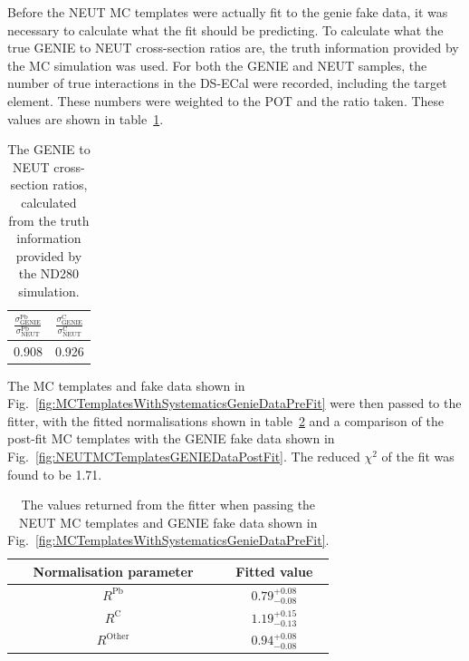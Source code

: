 \newline
\newline
Before the NEUT MC templates were actually fit to the genie fake data, it was necessary to calculate what the fit should be predicting.  To calculate what the true GENIE to NEUT cross-section ratios are, the truth information provided by the MC simulation was used.  For both the GENIE and NEUT samples, the number of true interactions in the DS-ECal were recorded, including the target element.  These numbers were weighted to the POT and the ratio taken.  These values are shown in table~\ref{table:GENIEToNEUTTrueCrossSectioRatio}.  
\begin{table}
  \begin{tabular}{c c }
    $\frac{\sigma^{\textrm{Pb}}_{\textrm{GENIE}}}{\sigma^{\textrm{Pb}}_{\textrm{NEUT}}}$ &$\frac{\sigma^{\textrm{C}}_{\textrm{GENIE}}}{\sigma^{\textrm{C}}_{\textrm{NEUT}}}$\\ \hline \hline
    0.908 & 0.926  \\
  \end{tabular}
  \caption{The GENIE to NEUT cross-section ratios, calculated from the truth information provided by the ND280 simulation.}
  \label{table:GENIEToNEUTTrueCrossSectioRatio}
\end{table}
\newline
\newline
The MC templates and fake data shown in Fig.~\ref{fig:MCTemplatesWithSystematicsGenieDataPreFit} were then passed to the fitter, with the fitted normalisations shown in table~\ref{table:NEUTMCTemplatesGENIEDataPostFit} and a comparison of the post-fit MC templates with the GENIE fake data shown in Fig.~\ref{fig:NEUTMCTemplatesGENIEDataPostFit}.  The reduced $\chi^2$ of the fit was found to be 1.71.  
\begin{table}
  \begin{tabular}{c c }
    Normalisation parameter & Fitted value \\ \hline \hline
    $R^{\textrm{Pb}}$ & $0.79^{+0.08}_{-0.08}$  \\
    $R^{\textrm{C}}$ & $1.19^{+0.15}_{-0.13}$  \\
    $R^{\textrm{Other}}$ & $0.94^{+0.08}_{-0.08}$  \\
  \end{tabular}
  \caption{The values returned from the fitter when passing the NEUT MC templates and GENIE fake data shown in Fig.~\ref{fig:MCTemplatesWithSystematicsGenieDataPreFit}.}
  \label{table:NEUTMCTemplatesGENIEDataPostFit}
\end{table}
